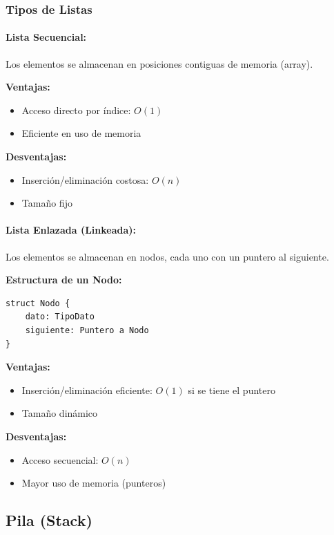 \documentclass[12pt,a4paper]{article}
\begin{document}
\subsubsection{Tipos de Listas}

\paragraph{Lista Secuencial:}
Los elementos se almacenan en posiciones contiguas de memoria (array).

\textbf{Ventajas:}
\begin{itemize}
    \item Acceso directo por índice: $O(1)$
    \item Eficiente en uso de memoria
\end{itemize}

\textbf{Desventajas:}
\begin{itemize}
    \item Inserción/eliminación costosa: $O(n)$
    \item Tamaño fijo
\end{itemize}

\paragraph{Lista Enlazada (Linkeada):}
Los elementos se almacenan en nodos, cada uno con un puntero al siguiente.

\textbf{Estructura de un Nodo:}
\begin{verbatim}
struct Nodo {
    dato: TipoDato
    siguiente: Puntero a Nodo
}
\end{verbatim}

\textbf{Ventajas:}
\begin{itemize}
    \item Inserción/eliminación eficiente: $O(1)$ si se tiene el puntero
    \item Tamaño dinámico
\end{itemize}

\textbf{Desventajas:}
\begin{itemize}
    \item Acceso secuencial: $O(n)$
    \item Mayor uso de memoria (punteros)
\end{itemize}

\subsection{Pila (Stack)}
\end{document}
